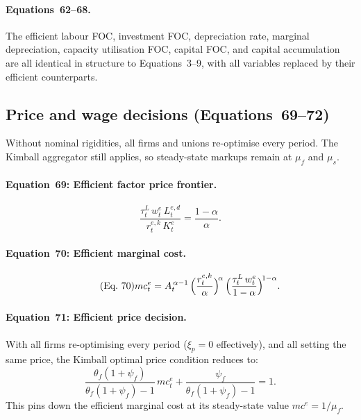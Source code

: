 \documentclass[11pt,a4paper]{article}
\begin{document}
\paragraph{Equations~62--68.} The efficient labour FOC, investment FOC,
depreciation rate, marginal depreciation, capacity utilisation FOC, capital
FOC, and capital accumulation are all identical in structure to
Equations~3--9, with all variables replaced by their efficient
counterparts.

\subsection{Price and wage decisions (Equations~69--72)}

Without nominal rigidities, all firms and unions re-optimise every period.
The Kimball aggregator still applies, so steady-state markups remain at
$\mu_f$ and $\mu_s$.

\paragraph{Equation~69: Efficient factor price frontier.}
\begin{equation}\tag{Eq.~69}
  \frac{\tau^L_t\,w^e_t\,L^{e,d}_t}{r^{e,k}_t\,K^e_t}
  = \frac{1-\alpha}{\alpha}.
\end{equation}

\paragraph{Equation~70: Efficient marginal cost.}
\begin{equation}\tag{Eq.~70}
  mc^e_t = A_t^{\,\alpha-1}\,
  \Bigl(\frac{r^{e,k}_t}{\alpha}\Bigr)^{\!\alpha}\,
  \Bigl(\frac{\tau^L_t\,w^e_t}{1-\alpha}\Bigr)^{\!1-\alpha}.
\end{equation}

\paragraph{Equation~71: Efficient price decision.}
With all firms re-optimising every period ($\xi_p = 0$ effectively), and all
setting the same price, the Kimball optimal price condition reduces to:
\begin{equation}\tag{Eq.~71}
  \frac{\theta_f(1+\psi_f)}{\theta_f(1+\psi_f)-1}\,mc^e_t
  + \frac{\psi_f}{\theta_f(1+\psi_f)-1}
  = 1.
\end{equation}
This pins down the efficient marginal cost at its steady-state value
$mc^e = 1/\mu_f$.
\end{document}
